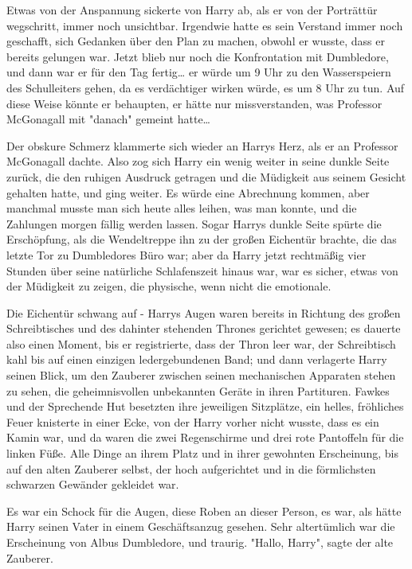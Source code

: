 {Etwas von der Anspannung sickerte von Harry ab, als er von der Porträttür wegschritt, immer noch unsichtbar. Irgendwie hatte es sein Verstand immer noch geschafft, sich Gedanken über den Plan zu machen, obwohl er wusste, dass er bereits gelungen war. Jetzt blieb nur noch die Konfrontation mit Dumbledore, und dann war er für den Tag fertig… er würde um 9 Uhr zu den Wasserspeiern des Schulleiters gehen, da es verdächtiger wirken würde, es um 8 Uhr zu tun. Auf diese Weise könnte er behaupten, er hätte nur missverstanden, was Professor McGonagall mit "danach" gemeint hatte…

Der obskure Schmerz klammerte sich wieder an Harrys Herz, als er an Professor McGonagall dachte. Also zog sich Harry ein wenig weiter in seine dunkle Seite zurück, die den ruhigen Ausdruck getragen und die Müdigkeit aus seinem Gesicht gehalten hatte, und ging weiter. Es würde eine Abrechnung kommen, aber manchmal musste man sich heute alles leihen, was man konnte, und die Zahlungen morgen fällig werden lassen. Sogar Harrys dunkle Seite spürte die Erschöpfung, als die Wendeltreppe ihn zu der großen Eichentür brachte, die das letzte Tor zu Dumbledores Büro war; aber da Harry jetzt rechtmäßig vier Stunden über seine natürliche Schlafenszeit hinaus war, war es sicher, etwas von der Müdigkeit zu zeigen, die physische, wenn nicht die emotionale.

Die Eichentür schwang auf - Harrys Augen waren bereits in Richtung des großen Schreibtisches und des dahinter stehenden Thrones gerichtet gewesen; es dauerte also einen Moment, bis er registrierte, dass der Thron leer war, der Schreibtisch kahl bis auf einen einzigen ledergebundenen Band; und dann verlagerte Harry seinen Blick, um den Zauberer zwischen seinen mechanischen Apparaten stehen zu sehen, die geheimnisvollen unbekannten Geräte in ihren Partituren. Fawkes und der Sprechende Hut besetzten ihre jeweiligen Sitzplätze, ein helles, fröhliches Feuer knisterte in einer Ecke, von der Harry vorher nicht wusste, dass es ein Kamin war, und da waren die zwei Regenschirme und drei rote Pantoffeln für die linken Füße. Alle Dinge an ihrem Platz und in ihrer gewohnten Erscheinung, bis auf den alten Zauberer selbst, der hoch aufgerichtet und in die förmlichsten schwarzen Gewänder gekleidet war.

Es war ein Schock für die Augen, diese Roben an dieser Person, es war, als hätte Harry seinen Vater in einem Geschäftsanzug gesehen. Sehr altertümlich war die Erscheinung von Albus Dumbledore, und traurig. "Hallo, Harry", sagte der alte Zauberer.

}
